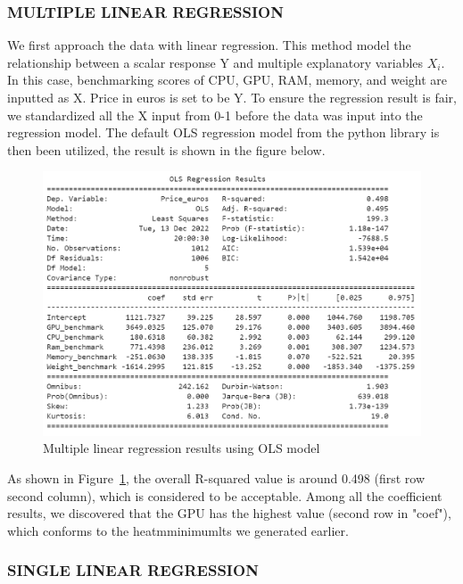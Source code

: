 \documentclass{scrartcl}
\begin{document}
\subsubsection{MULTIPLE LINEAR REGRESSION}

We first approach the data with linear regression. This method model the relationship between a scalar response Y and multiple explanatory variables $X_i$. In this case, benchmarking scores of CPU, GPU, RAM, memory, and weight are inputted as X. Price in euros is set to be Y. To ensure the regression result is fair, we standardized all the X input from 0-1 before the data was input into the regression model. The default OLS regression model from the python library\cite{chen} is then been utilized, the result is shown in the figure below.

\begin{figure}[H]
	\begin{center}
		\includegraphics[scale=0.6]{Graphics/4520 final/OLS_regression.png}
	\end{center}
	\caption{Multiple linear regression results using OLS model}
	\label{fig:OLS}
\end{figure}

\noindent As shown in Figure~\ref{fig:OLS}, the overall R-squared value is around 0.498 (first row second column), which is considered to be acceptable. Among all the coefficient results, we discovered that the GPU has the highest value (second row in "coef"), which conforms to the heatmminimumlts we generated earlier. 

\subsubsection{SINGLE LINEAR REGRESSION}
\end{document}
